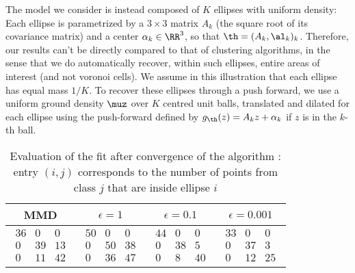 The model we consider is instead composed of $K$ ellipses with uniform density: Each ellipse is parametrized by a $3\times 3$ matrix $A_k$ (the square root of its covariance matrix) and a center $\alpha_k \in \RR^3$, so that $\th=(A_k,\al_k)_k$. Therefore, our results can't be directly compared to that of clustering algorithms, in the sense that we do automatically recover, within such ellipses, entire areas of interest (and not voronoi cells). We assume in this illustration that each ellipse has equal mass $1/K$.
To recover these ellipses through a push forward, we use a uniform ground density $\muz$ over $K$ centred unit balls, translated and dilated for each ellipse using the push-forward defined by $g_{\th}(z) = A_k z + \alpha_k$ if $z$ is in the $k$-th ball. 

\begin{table}
\centering
 \begin{tabular}{|c|c|c|c| } \hline
 MMD & $\epsilon = 1$ & $\epsilon = 0.1$ & $\epsilon = 0.001$ \\ \hline \hline
     $\begin{matrix} 36 & 0 & 0 \\ 0 & 39 & 13 \\
 0 & 11 & 42 \end{matrix}$
     &
     $\begin{matrix} 50 & 0 & 0 \\ 0 & 50 & 38 \\
0 & 36 & 47 \end{matrix}$
     & $\begin{matrix} 44 & 0 & 0 \\ 0 & 38 & 5 \\ 0 & 8 & 40 \end{matrix}$
     & $\begin{matrix}  33 & 0 & 0 \\  0 & 37 & 3 \\ 0 & 12 & 25\end{matrix}$
     \\\hline
    \end{tabular}
\caption{Evaluation of the fit after convergence of the algorithm : entry $(i,j)$ corresponds to the number of points from class $j$ that are inside ellipse $i$} \label{tab:clustering}
  \end{table}

